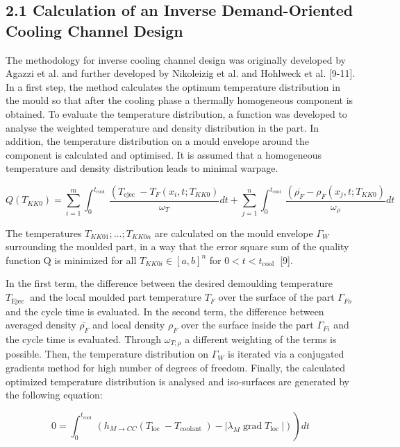 \documentclass[10pt]{article}
\begin{document}
\subsection*{2.1 Calculation of an Inverse Demand-Oriented Cooling Channel Design}
The methodology for inverse cooling channel design was originally developed by Agazzi et al. and further developed by Nikoleizig et al. and Hohlweck et al. [9-11]. In a first step, the method calculates the optimum temperature distribution in the mould so that after the cooling phase a thermally homogeneous component is obtained. To evaluate the temperature distribution, a function was developed to analyse the weighted temperature and density distribution in the part. In addition, the temperature distribution on a mould envelope around the component is calculated and optimised. It is assumed that a homogeneous temperature and density distribution leads to minimal warpage.


\begin{equation*}
Q\left(T_{K K 0}\right)=\sum_{i=1}^{m} \int_{0}^{t_{\text {cool }}} \frac{\left(T_{\text {ejec }}-T_{F}\left(x_{i}, t ; T_{K K 0}\right)\right.}{\omega_{T}} d t+\sum_{j=1}^{n} \int_{0}^{t_{\text {cool }}} \frac{\left(\overline{\rho_{F}}-\rho_{F}\left(x_{j}, t ; T_{K K 0}\right)\right.}{\omega_{\rho}} d t \tag{1}
\end{equation*}


The temperatures $T_{K K 01} ; \ldots ; T_{K K 0 n}$ are calculated on the mould envelope $\Gamma_{W}$ surrounding the moulded part, in a way that the error square sum of the quality function $\mathrm{Q}$ is minimized for all $T_{K K 0 i} \in[a, b]^{n}$ for $0<t<t_{\text {cool }}$ [9].

In the first term, the difference between the desired demoulding temperature $T_{\text {Ejec }}$ and the local moulded part temperature $T_{F}$ over the surface of the part $\Gamma_{F o}$ and the cycle time is evaluated. In the second term, the difference between averaged density $\overline{\rho_{F}}$ and local density $\rho_{F}$ over the surface inside the part $\Gamma_{F i}$ and the cycle time is evaluated. Through $\omega_{T ; \rho}$ a different weighting of the terms is possible. Then, the temperature distribution on $\Gamma_{W}$ is iterated via a conjugated gradients method for high number of degrees of freedom. Finally, the calculated optimized temperature distribution is analysed and iso-surfaces are generated by the following equation:


\begin{equation*}
\left.0=\int_{0}^{t_{\text {cool }}}\left(h_{M \rightarrow C C}\left(T_{\text {loc }}-T_{\text {coolant }}\right)-\left|\lambda_{M} \operatorname{grad} T_{\text {loc }}\right|\right)\right) d t \tag{2}
\end{equation*}
\end{document}
